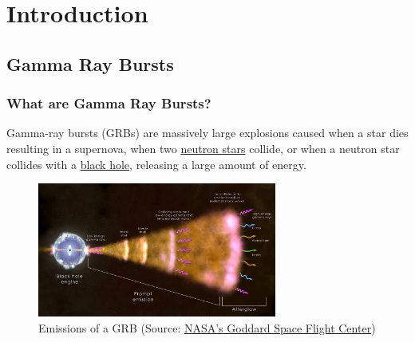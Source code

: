 \documentclass[11pt]{book} %
\begin{document}



\pagestyle{empty} %
\tableofcontents %

\pagestyle{fancy} %



\chapter{Introduction}
\section{Gamma Ray Bursts}
\subsection{What are Gamma Ray Bursts?}
Gamma-ray bursts (GRBs) are massively large explosions caused when a star dies resulting in a supernova, when two \href{https://en.wikipedia.org/wiki/Neutron_star}{neutron stars} collide, or when a neutron star collides with a \href{https://en.wikipedia.org/wiki/Black_hole}{black hole}, releasing a large amount of energy.  

\begin{figure}[H]
\centering
    \includegraphics[width=0.7\textwidth]{Pictures/grb_shell_final_0.jpg}
    \caption{Emissions of a GRB (Source: \href{https://www.nasa.gov/feature/goddard/2023/nasa-missions-study-what-may-be-a-1-in-10000-year-Gamma-ray-burst}{NASA's Goddard Space Flight Center})}
\end{figure}
\end{document}
